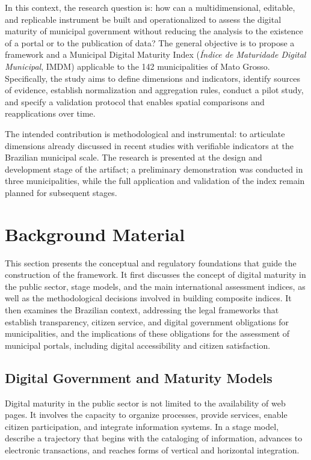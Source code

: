 \documentclass[12pt]{article}
\begin{document}
In this context, the research question is: how can a multidimensional, editable, and replicable instrument be built and operationalized to assess the digital maturity of municipal government without reducing the analysis to the existence of a portal or to the publication of data? The general objective is to propose a framework and a Municipal Digital Maturity Index (\textit{Índice de Maturidade Digital Municipal}, IMDM) applicable to the 142 municipalities of Mato Grosso. Specifically, the study aims to define dimensions and indicators, identify sources of evidence, establish normalization and aggregation rules, conduct a pilot study, and specify a validation protocol that enables spatial comparisons and reapplications over time. 

The intended contribution is methodological and instrumental: to articulate dimensions already discussed in recent studies with verifiable indicators at the Brazilian municipal scale. The research is presented at the design and development stage of the artifact; a preliminary demonstration was conducted in three municipalities, while the full application and validation of the index remain planned for subsequent stages.


\section{Background Material}

This section presents the conceptual and regulatory foundations that guide the construction of the framework. It first discusses the concept of digital maturity in the public sector, stage models, and the main international assessment indices, as well as the methodological decisions involved in building composite indices. It then examines the Brazilian context, addressing the legal frameworks that establish transparency, citizen service, and digital government obligations for municipalities, and the implications of these obligations for the assessment of municipal portals, including digital accessibility and citizen satisfaction.

\subsection{Digital Government and Maturity Models}

Digital maturity in the public sector is not limited to the availability of web pages. It involves the capacity to organize processes, provide services, enable citizen participation, and integrate information systems. In a stage model, \cite{layneLee2001} describe a trajectory that begins with the cataloging of information, advances to electronic transactions, and reaches forms of vertical and horizontal integration.
\end{document}
